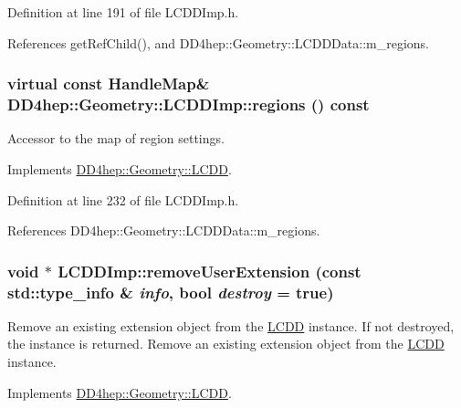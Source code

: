 Definition at line 191 of file LCDDImp.h.

References getRefChild(), and DD4hep::Geometry::LCDDData::m\_\-regions.\hypertarget{class_d_d4hep_1_1_geometry_1_1_l_c_d_d_imp_a6037f7f69bd80cb6c73f8399a739645f}{
\subsubsection[{regions}]{\setlength{\rightskip}{0pt plus 5cm}virtual const {\bf HandleMap}\& DD4hep::Geometry::LCDDImp::regions () const}}
\label{class_d_d4hep_1_1_geometry_1_1_l_c_d_d_imp_a6037f7f69bd80cb6c73f8399a739645f}


Accessor to the map of region settings. 

Implements \hyperlink{class_d_d4hep_1_1_geometry_1_1_l_c_d_d_ab068e5aaa1d76a2348ea74ea3d76f96f}{DD4hep::Geometry::LCDD}.

Definition at line 232 of file LCDDImp.h.

References DD4hep::Geometry::LCDDData::m\_\-regions.\hypertarget{class_d_d4hep_1_1_geometry_1_1_l_c_d_d_imp_a9e43af7ad956710acab4aead5a41dc13}{
\subsubsection[{removeUserExtension}]{\setlength{\rightskip}{0pt plus 5cm}void $\ast$ LCDDImp::removeUserExtension (const std::type\_\-info \& {\em info}, \/  bool {\em destroy} = {\ttfamily true})}}
\label{class_d_d4hep_1_1_geometry_1_1_l_c_d_d_imp_a9e43af7ad956710acab4aead5a41dc13}


Remove an existing extension object from the \hyperlink{class_d_d4hep_1_1_geometry_1_1_l_c_d_d}{LCDD} instance. If not destroyed, the instance is returned. Remove an existing extension object from the \hyperlink{class_d_d4hep_1_1_geometry_1_1_l_c_d_d}{LCDD} instance. 

Implements \hyperlink{class_d_d4hep_1_1_geometry_1_1_l_c_d_d_a05c121b360d248ce34a2d9337df9f49b}{DD4hep::Geometry::LCDD}.

